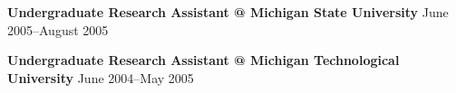 \documentclass[11pt]{article}
\makeatletter
\newcommand{\jobitem}[4]{
    \vspace{2pt}

    \textbf{#1 @ #2} \hfill #3 %

    \vspace{-8pt}
}
\makeatother
\begin{document}

%

\vspace{-6pt}
\jobitem{Undergraduate Research Assistant}{Michigan State University}{June 2005--August 2005}{East Lansing, MI}
\vspace{10pt}


\jobitem{Undergraduate Research Assistant}{Michigan Technological University}{June 2004--May 2005}{Houghton, MI}

\end{document}
